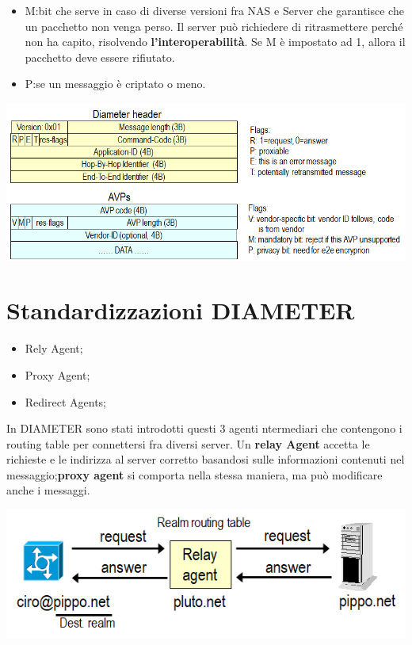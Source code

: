 \documentclass{book}
\theoremstyle{remark}
\begin{document}
\begin{itemize}
\begin{itemize}
\begin{itemize}
\begin{itemize}
				                  \item M:\@Mandatory bit che serve in caso di diverse versioni fra NAS e Server che garantisce che un pacchetto non venga perso\@. Il server può richiedere di ritrasmettere perché non ha capito, risolvendo \textbf{l'interoperabilità}\@. Se M è impostato ad 1, allora il pacchetto deve essere rifiutato\@.
				                  \item P:\@dice se un messaggio è criptato o meno\@.
			                  \end{itemize}
			                  \begin{center}
				                  \includegraphics[scale=0.5]{DIAMETERPARAM.png}
			                  \end{center}
		            \end{itemize}
	      \end{itemize}
\end{itemize}
\section{Standardizzazioni DIAMETER}
\begin{itemize}
	\item Rely Agent;\@
	\item Proxy Agent;\@
	\item Redirect Agents;\@
\end{itemize}
In DIAMETER sono stati introdotti questi 3 agenti ntermediari che contengono i routing table per connettersi fra diversi server\@.\newline
Un \textbf{relay Agent} accetta le richieste e le indirizza al server corretto basandosi sulle informazioni contenuti nel messaggio;\@un \textbf{proxy agent} si comporta nella stessa maniera, ma può modificare anche i messaggi\@.
\begin{center}
	\includegraphics[scale=0.5]{relyAgent.png}
\end{center}
\end{document}
